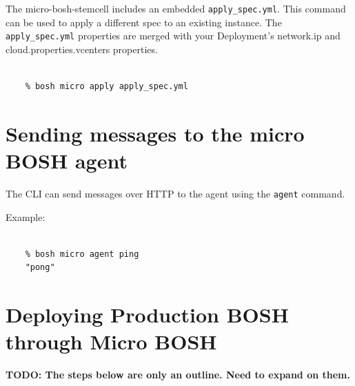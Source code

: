 The micro-bosh-stemcell includes an embedded \texttt{apply\_spec.yml}. This command can be used to apply a different spec to an existing instance. The \texttt{apply\_spec.yml} properties are merged with your Deployment's network.ip and cloud.properties.vcenters properties.

\begin{adjustwidth}{2.5em}{2.5em}
\begin{verbatim}

    % bosh micro apply apply_spec.yml

\end{verbatim}
\end{adjustwidth}

\section{Sending messages to the micro BOSH agent}
\label{sendingmessagestothemicroboshagent}

The CLI can send messages over HTTP to the agent using the \texttt{agent} command.

Example:

\begin{adjustwidth}{2.5em}{2.5em}
\begin{verbatim}

    % bosh micro agent ping
    "pong"

\end{verbatim}
\end{adjustwidth}

\section{Deploying Production BOSH through Micro BOSH}
\label{deployingproductionboshthroughmicrobosh}

\textbf{TODO: The steps below are only an outline. Need to expand on them.}

